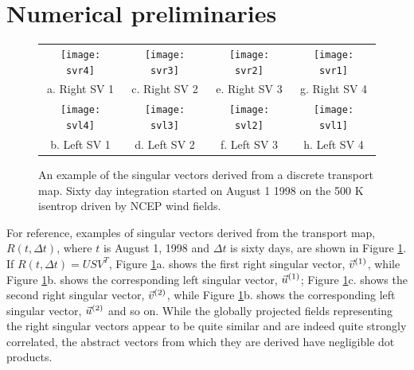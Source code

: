 \section{Numerical preliminaries}

\begin{figure}
  \begin{tabular}{cccc}
    \texttt{[image: svr4]} &
    \texttt{[image: svr3]} &
    \texttt{[image: svr2]} &
    \texttt{[image: svr1]} \\
    a. Right SV 1 & c. Right SV 2 & e. Right SV 3 & g. Right SV 4 \\
    \texttt{[image: svl4]} &
    \texttt{[image: svl3]} &
    \texttt{[image: svl2]} &
    \texttt{[image: svl1]} \\
    b. Left SV 1 & d. Left SV 2 & f. Left SV 3 & h. Left SV 4
  \end{tabular}
  \caption{An example of the singular vectors derived from a discrete transport map.
  Sixty day integration started on August 1 1998 on the 500 K isentrop driven by NCEP wind fields.}
  \label{sample_SV}
\end{figure}

For reference, examples of singular vectors derived from the transport map,
$R(t, \Delta t)$, where $t$ is August 1, 1998 and $\Delta t$ is sixty days,
are shown in Figure \ref{sample_SV}.
If $R(t, \Delta t)=U S V^T$,
Figure \ref{sample_SV}a. shows the first right singular vector, $\vec v^{(1)}$,
while Figure \ref{sample_SV}b. shows the corresponding left singular vector,
$\vec u^{(1)}$;
Figure \ref{sample_SV}c. shows the second right singular vector, $\vec v^{(2)}$,
while Figure \ref{sample_SV}b. shows the corresponding left singular vector,
$\vec u^{(2)}$
and so on.
While the globally projected fields representing the right singular vectors 
appear to be quite similar and are indeed
quite strongly correlated, the abstract vectors from which they are derived
have negligible dot products.

